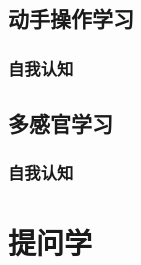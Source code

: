 \documentclass[12pt]{book}
\begin{document}
\section{动手操作学习}
\subsection{自我认知}

\section{多感官学习}
\subsection{自我认知}


\chapter{提问学}
\end{document}
